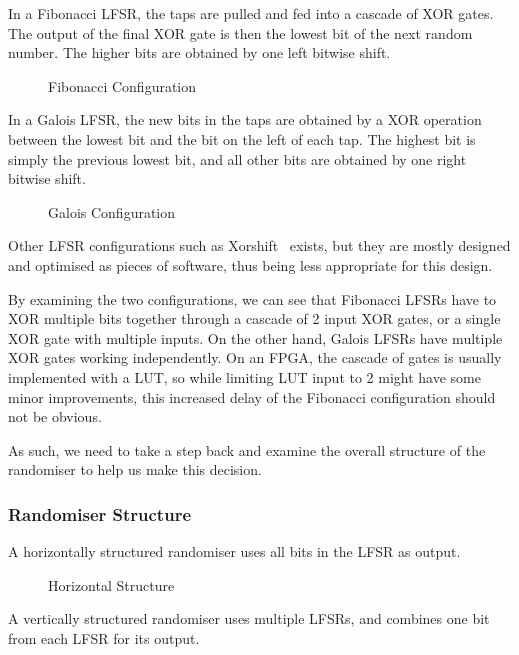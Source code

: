 In a Fibonacci LFSR, the taps are pulled and fed into a cascade of XOR gates.
The output of the final XOR gate is then the lowest bit of the next random number.
The higher bits are obtained by one left bitwise shift.

\begin{figure}[ht]
  \centering
  
  \caption{Fibonacci Configuration}
  \label{FibLFSR}
\end{figure}

In a Galois LFSR, the new bits in the taps are obtained by a XOR operation between the lowest bit and the bit on the left of each tap.
The highest bit is simply the previous lowest bit, and all other bits are obtained by one right bitwise shift.

\begin{figure}[ht]
  \centering
  
  \caption{Galois Configuration}
  \label{GalLFSR}
\end{figure}

Other LFSR configurations such as Xorshift~\cite{Marsaglia1} exists, but they are mostly designed and optimised as pieces of software, thus being less appropriate for this design.

By examining the two configurations, we can see that Fibonacci LFSRs have to XOR multiple bits together through a cascade of 2 input XOR gates, or a single XOR gate with multiple inputs.
On the other hand, Galois LFSRs have multiple XOR gates working independently.
On an FPGA, the cascade of gates is usually implemented with a LUT, so while limiting LUT input to 2 might have some minor improvements, this increased delay of the Fibonacci configuration should not be obvious.

As such, we need to take a step back and examine the overall structure of the randomiser to help us make this decision.

\subsubsection{Randomiser Structure}

A horizontally structured randomiser uses all bits in the LFSR as output.

\begin{figure}[ht]
  \centering
  
  \caption{Horizontal Structure}
  \label{HoriLFSR}
\end{figure}

A vertically structured randomiser uses multiple LFSRs, and combines one bit from each LFSR for its output.

